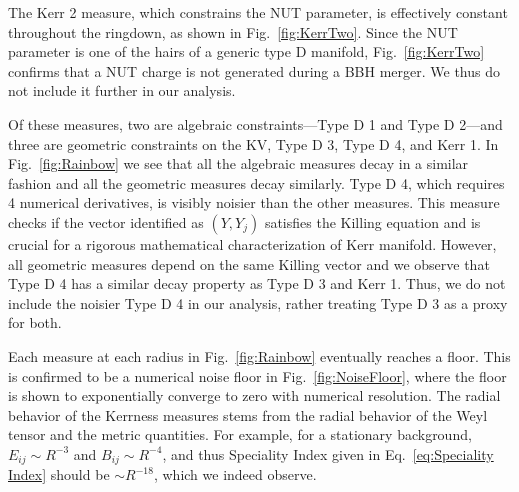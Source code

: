 \SwirlFigure

The Kerr 2 measure, which constrains the NUT parameter, is effectively constant throughout the ringdown, as shown in Fig.~\ref{fig:KerrTwo}. Since the NUT parameter is one of the hairs of a generic type D manifold, Fig.~\ref{fig:KerrTwo} confirms that a NUT charge is not generated during a BBH merger. We thus do not include it further in our analysis. 

\KerrTwoFigure

Of these measures, two are algebraic constraints---Type D 1 and Type D 2---and three are geometric constraints on the KV, Type D 3, Type D 4, and Kerr 1. In Fig.~\ref{fig:Rainbow} we see that all the algebraic measures decay in a similar fashion and all the geometric measures decay similarly. Type D 4, which requires 4 numerical derivatives, is visibly noisier than the other measures. This measure checks if the vector identified as $(Y,Y_{j})$ satisfies the Killing equation and is crucial for a rigorous mathematical characterization of Kerr manifold. However, all geometric measures depend on the same Killing vector and we observe that Type D 4 has a similar decay property as Type D 3 and Kerr 1. Thus, we do not include the noisier Type D 4 in our analysis, rather treating Type D 3 as a proxy for both. 



Each measure at each radius in Fig.~\ref{fig:Rainbow} eventually reaches a floor. This is confirmed to be a numerical noise floor in Fig.~\ref{fig:NoiseFloor}, where the floor is shown to exponentially converge to zero with numerical resolution. The radial behavior of the Kerrness measures stems from the radial behavior of the Weyl tensor and the metric quantities. For example, for a stationary background, $E_{ij} \sim R^{-3}$ and $B_{ij} \sim R^{-4}$, and thus Speciality Index given in Eq.~\eqref{eq:Speciality Index} should be $\sim R^{-18}$, which we indeed observe. 

